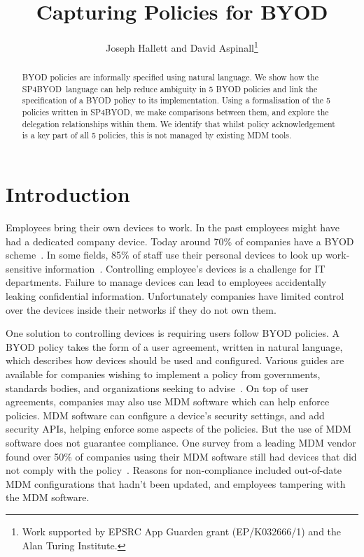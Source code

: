 \documentclass{llncs}
\title{Capturing Policies for BYOD}
\author{Joseph Hallett and David Aspinall\thanks{Work supported by EPSRC App Guarden grant (EP/K032666/1) and the Alan Turing Institute.}}
\institute{School of Informatics, University of Edinburgh}
\newcommand{\AppPAL}[0]{SP4BYOD}
\begin{document}
\maketitle
\begin{abstract}
  BYOD policies are informally specified using natural language.
  We show how the \AppPAL~language can help reduce ambiguity in 5 BYOD policies and link the specification of a BYOD policy to its implementation.
  Using a formalisation of the 5 policies written in \AppPAL, we make comparisons between them, and explore the delegation relationships within them.
  We identify that whilst policy acknowledgement is a key part of all 5 policies, this is not managed by existing MDM tools.
\end{abstract}
\section{Introduction}
\label{sec:intro}

Employees bring their own devices to work.
In the past employees might have had a dedicated company device. 
Today around 70\% of companies have a BYOD scheme~\cite{schulze_byod_2016}. 
In some fields, 85\% of staff use their personal devices to look up work-sensitive information~\cite{patel_uk_2015}.
Controlling employee's devices is a challenge for IT departments.
Failure to manage devices can lead to employees accidentally leaking confidential information.
Unfortunately companies have limited control over the devices inside their networks if they do not own them.

One solution to controlling devices is requiring users follow BYOD policies.
A BYOD policy takes the form of a user agreement, written in natural language, which describes how devices should be used and configured.
Various guides are available for companies wishing to implement a policy from governments, standards bodies, and organizations seeking to advise~\cite{nicholas_r._c._guerin_security_2008,souppaya_guidelines_????,cesg_byod_2015}.
On top of user agreements, companies may also use \ac{MDM} software which can help enforce policies.
\ac{MDM} software can configure a device's security settings, and add security APIs, helping enforce some aspects of the policies.
But the use of \ac{MDM} software does not guarantee compliance.
One survey from a leading MDM vendor found over 50\% of companies using their \ac{MDM} software still had devices that did not comply with the policy~\cite{mobileiron_security_labs_q4_2015}.
Reasons for non-compliance included out-of-date \ac{MDM} configurations that hadn't been updated, and employees tampering with the \ac{MDM} software.
\end{document}

